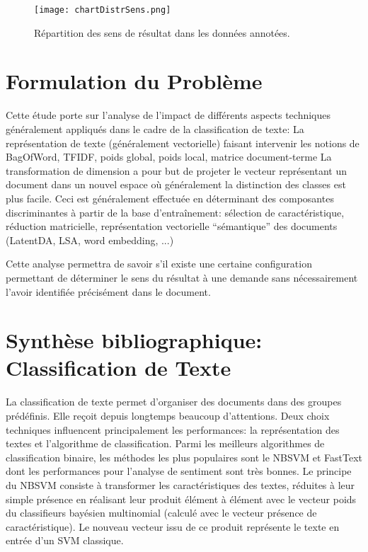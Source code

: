 \begin{figure}
\texttt{[image: chartDistrSens.png]}
\caption{Répartition des sens de résultat dans les données annotées.}\label{stat-sensrst}
\end{figure}
\section{Formulation du Problème}
\label{sec:sensresultat:probleme}

Cette étude porte sur l'analyse de l'impact de différents aspects techniques généralement appliqués dans le cadre de la classification de texte:
La représentation de texte (généralement vectorielle) faisant intervenir les notions de BagOfWord, TFIDF, poids global, poids local, matrice document-terme
La transformation de dimension a pour but de projeter le vecteur représentant un document dans un nouvel espace où généralement la distinction des classes est plus facile. Ceci est généralement effectuée en déterminant des composantes discriminantes à partir de la base d'entraînement: sélection de caractéristique, réduction matricielle, représentation vectorielle “sémantique” des documents (LatentDA, LSA, word embedding, ...)

 Cette analyse permettra de savoir s'il existe une certaine configuration permettant de déterminer le sens du résultat à une demande sans nécessairement l'avoir identifiée précisément dans le document. 


\section{Synthèse bibliographique: Classification de Texte}
\label{sec:sensresultat:biblio_classif}

La classification de texte permet d'organiser des documents dans des groupes prédéfinis. Elle reçoit depuis longtemps beaucoup d'attentions. Deux choix techniques influencent principalement les performances: la représentation des textes et l'algorithme de classification. Parmi les meilleurs algorithmes de classification binaire, les méthodes les plus populaires sont le NBSVM et FastText dont les performances pour l'analyse de sentiment sont très bonnes. Le principe du NBSVM \citep{wang2012nbsvm} consiste à transformer les caractéristiques des textes, réduites à leur simple présence en réalisant leur produit élément à élément avec le vecteur poids du classifieurs bayésien multinomial (calculé avec le vecteur présence de caractéristique). Le nouveau vecteur issu de ce produit représente le texte en entrée d'un SVM classique.
  
